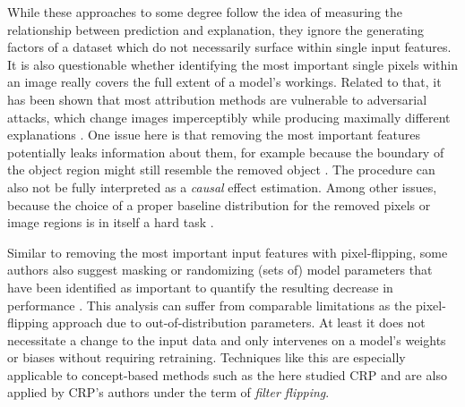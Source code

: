 While these approaches to some degree follow the idea of measuring the relationship between prediction and explanation, they ignore the generating factors of a dataset which do not necessarily surface within single input features. It is also questionable whether identifying the most important single pixels within an image really covers the full extent of a model's workings. Related to that, it has been shown that most attribution methods are vulnerable to adversarial attacks, which change images imperceptibly while producing maximally different explanations \citep{Ghorbani2019a, Anders2020, Dombrowski2022,Dombrowski2019}. One issue here is that removing the most important features potentially leaks information about them, for example because the boundary of the object region might still resemble the removed object \citep{Rong2022}.
The procedure can also not be fully interpreted as a \textit{causal} effect estimation. Among other issues, because the choice of a proper baseline distribution for the removed pixels or image regions is in itself a hard task \citep{Chang2019,Hooker2019, Popescu2021, Rong2022}. 

Similar to removing the most important input features with pixel-flipping, some authors also suggest masking or randomizing (sets of) model parameters that have been identified as important to quantify the resulting decrease in performance \citep{Ghorbani2019,Zhang2021,Achtibat2022, Fel2023}. 
This analysis can suffer from comparable limitations as the pixel-flipping approach due to out-of-distribution parameters. At least it does not necessitate a change to the input data and only intervenes on a model's weights or biases without requiring retraining.
Techniques like this are especially applicable to concept-based methods such as the here studied CRP and are also applied by CRP's authors under the term of \textit{filter flipping}. 

